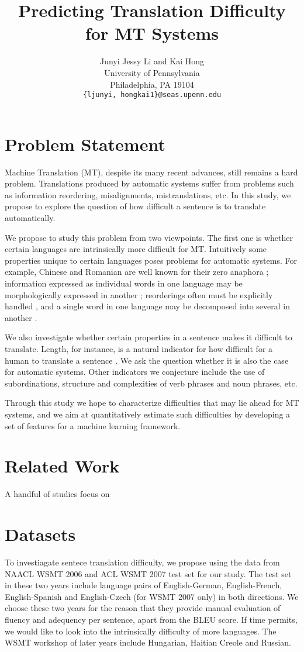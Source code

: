 \documentclass[11pt]{article}
\title{Predicting Translation Difficulty for MT Systems}
\author{
	Junyi Jessy Li and Kai Hong\\
   University of Pennsylvania \\
   Philadelphia, PA 19104 \\
  	{\tt \{ljunyi, hongkai1\}@seas.upenn.edu}}
\begin{document}
\maketitle


\section{Problem Statement}
Machine Translation (MT), despite its many recent advances, still remains a hard problem. Translations produced by automatic systems suffer from problems such as information reordering, misalignments, mistranslations, etc. In this study, we propose to explore the question of how difficult a sentence is to translate automatically.

We propose to study this problem from two viewpoints. The first one is whether certain languages are intrinsically more difficult for MT. Intuitively some properties unique to certain languages poses problems for automatic systems. For example, Chinese and Romanian are well known for their zero anaphora \cite{zhao-ng:2007:EMNLP-CoNLL2007,mihuailua2011zero}; information expressed as individual words in one language may be morphologically expressed in another \cite{minkov-toutanova-suzuki:2007:ACLMain}; reorderings often must be explicitly handled \cite{Wang07chinesesyntactic}, and a single word in one language may be decomposed into several in another \cite{maja-compound}.

We also investigate whether certain properties in a sentence makes it difficult to translate. 
Length, for instance, is a natural indicator for how difficult for a human to translate a sentence \cite{mishra-bhattacharyya-carl:2013:Short}. 
We ask the question whether it is also the case for automatic systems. 
Other indicators we conjecture include the use of subordinations, structure and complexities of verb phrases and noun phrases, etc.

Through this study we hope to characterize difficulties that may lie ahead for MT systems, and we aim at quantitatively estimate such difficulties by developing a set of features for a machine learning framework.

\section{Related Work}
A handful of studies focus on 

\section{Datasets}
To investiagate sentece translation difficulty, we propose using the data from NAACL WSMT 2006 \cite{WMT:2006} and ACL WSMT 2007 \cite{WMT:2007} test set for our study. 
The test set in these two years include language pairs of English-German, English-French, English-Spanish and English-Czech (for WSMT 2007 only) in both directions. 
We choose these two years for the reason that they provide manual evaluation of fluency and adequency per sentence, apart from the BLEU score. 
If time permits, we would like to look into the intrinsically difficulty of more languages. The WSMT workshop of later years include Hungarian, Haitian Creole and Russian. 
\end{document}
